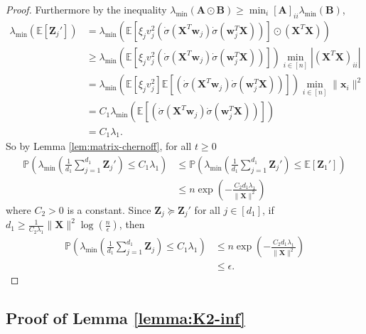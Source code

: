 \documentclass{article}
\theoremstyle{definition}
\renewcommand{\P}{\mathbb{P}}
\newcommand{\E}{\mathbb{E}}
\def\vw{{\bm{w}}}
\def\vx{{\bm{x}}}
\def\mA{{\bm{A}}}
\def\mB{{\bm{B}}}
\def\mX{{\bm{X}}}
\def\mZ{{\bm{Z}}}
\begin{document}
\begin{proof}
Furthermore by the inequality $\lambda_{\min}(\mA \odot \mB) \geq \min_i [\mA]_{ii} \lambda_{\min}(\mB)$,
\begin{align*}
    \lambda_{\min}\left(\E[\mZ_j'] \right) &= \lambda_{\min}\left(\E\left[\xi_jv_j^2\left(\dot{\sigma}\left(\mX^T \vw_j \right)\dot{\sigma}\left(\vw_j^T \mX\right)\right)  \right]\odot \left(\mX^T \mX \right) \right)\\
    &\geq \lambda_{\min}\left(\E\left[\xi_jv_j^2\left(\dot{\sigma}\left(\mX^T \vw_j \right)\dot{\sigma}\left(\vw_j^T\mX\right)\right)  \right] \right)\min_{i \in [n]}\left|\left(\mX^T \mX\right)_{ii} \right|\\
    &= \lambda_{\min}\left(\E\left[\xi_jv_j^2\right] \E\left[\left(\dot{\sigma}\left(\mX^T \vw_j \right)\dot{\sigma}\left(\vw_j^T\mX\right)\right)  \right] \right)\min_{i \in [n]} \|\vx_i\|^2\\
    &= C_1\lambda_{\min}\left( \E\left[\left(\dot{\sigma}\left(\mX^T \vw_j \right)\dot{\sigma}\left(\vw_j^T\mX\right)\right)  \right] \right)\\
    &= C_1 \lambda_1.
\end{align*}
So by Lemma \ref{lem:matrix-chernoff}, for all $t \geq 0$
\begin{align*}
    \P\left(\lambda_{\min}\left(\frac{1}{d_1}\sum_{j = 1}^{d_1}\mZ_j' \right) \leq C_1 \lambda_1 \right) &\leq \P\left(\lambda_{\min}\left(\frac{1}{d_1}\sum_{j = 1}^{d_1}\mZ_j' \right) \leq \E[\mZ_1'] \right)\\
    &\leq n\exp\left(-\frac{C_2 d_1 \lambda_1 }{\|\mX\|^2} \right)
\end{align*}
where $C_2 > 0$ is a constant. Since $\mZ_j \succeq \mZ_j'$ for all $j \in [d_1]$, if $d_1 \geq \frac{1}{C_2\lambda_1}\|\mX\|^2 \log\left(\frac{n}{\epsilon}\right)$, then
\begin{align*}
    \P\left(\lambda_{\min}\left(\frac{1}{d_1}\sum_{j  =1}^{d_1}\mZ_j \right) \leq C_1 \lambda_1 \right) &\leq n \exp\left(-\frac{C_2d_1 \lambda_1}{\|\mX\|^2}\right)\\
    &\leq \epsilon.
\end{align*}
\end{proof}


\subsection{Proof of Lemma \ref{lemma:K2-inf}} \label{app:lemma:K2-inf}
\end{document}
